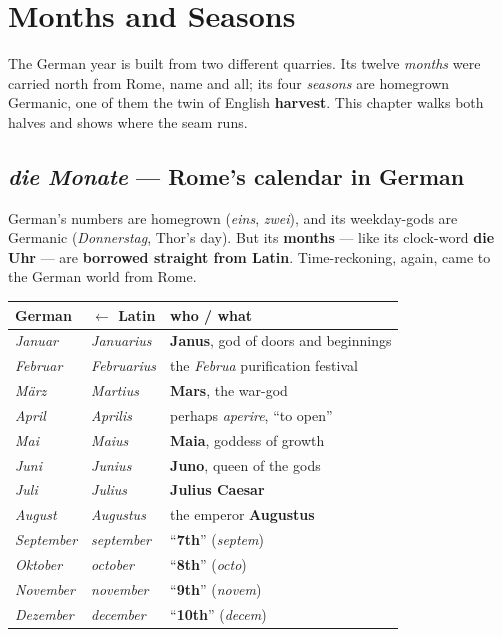 \chapter{Months and Seasons}
\label{ch:months-seasons}

The German year is built from two different quarries. Its twelve
\emph{months} were carried north from Rome, name and all; its four
\emph{seasons} are homegrown Germanic, one of them the twin of English
\textbf{harvest}. This chapter walks both halves and shows where the seam runs.

\section{\emph{die Monate} --- Rome's calendar in German}
\label{lesson:monate}

German's numbers are homegrown (\emph{eins}, \emph{zwei}), and its weekday-gods
are Germanic (\emph{Donnerstag}, Thor's day). But its \textbf{months} --- like
its clock-word \textbf{die Uhr} --- are \textbf{borrowed straight from Latin}.
Time-reckoning, again, came to the German world from Rome.

\begin{center}
\begin{tabular}{@{}lll@{}}
\toprule
German & $\leftarrow$ Latin & who / what \\
\midrule
\emph{Januar} & \emph{Januarius} & \textbf{Janus}, god of doors and beginnings \\
\emph{Februar} & \emph{Februarius} & the \emph{Februa} purification festival \\
\emph{M\"{a}rz} & \emph{Martius} & \textbf{Mars}, the war-god \\
\emph{April} & \emph{Aprilis} & perhaps \emph{aperire}, ``to open'' \\
\emph{Mai} & \emph{Maius} & \textbf{Maia}, goddess of growth \\
\emph{Juni} & \emph{Junius} & \textbf{Juno}, queen of the gods \\
\emph{Juli} & \emph{Julius} & \textbf{Julius Caesar} \\
\emph{August} & \emph{Augustus} & the emperor \textbf{Augustus} \\
\emph{September} & \emph{september} & ``\textbf{7th}'' (\emph{septem}) \\
\emph{Oktober} & \emph{october} & ``\textbf{8th}'' (\emph{octo}) \\
\emph{November} & \emph{november} & ``\textbf{9th}'' (\emph{novem}) \\
\emph{Dezember} & \emph{december} & ``\textbf{10th}'' (\emph{decem}) \\
\bottomrule
\end{tabular}
\end{center}

